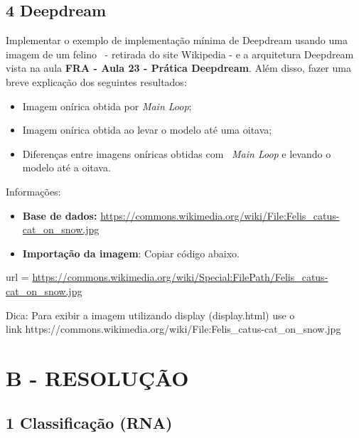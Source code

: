\subsection*{\textbf{4 Deepdream}}


Implementar o exemplo de implementação mínima de Deepdream usando uma imagem de um felino \ {}- retirada do site
Wikipedia - e a arquitetura Deepdream vista na aula \textbf{FRA - Aula 23 - Prática Deepdream}. Além disso, fazer uma
breve explicação dos seguintes resultados: 

\begin{itemize}
\item Imagem onírica obtida por \textit{Main Loop};
\item Imagem onírica obtida ao levar o modelo até uma oitava;
\item Diferenças entre imagens oníricas obtidas com \ \textit{Main Loop }e levando o modelo até a oitava.
\end{itemize}
Informações:

\begin{itemize}[resume*=listWWNumxiii]
\item \textbf{Base de dados: }\url{https://commons.wikimedia.org/wiki/File:Felis_catus-cat_on_snow.jpg}
\end{itemize}
\begin{itemize}
\item \textbf{Importação da imagem}: Copiar código abaixo.
\end{itemize}

\foreignlanguage{english}{\textcolor[HTML]{188038}{url =
{\textquotedbl}}}\url{https://commons.wikimedia.org/wiki/Special:FilePath/Felis_catus-cat_on_snow.jpg}\foreignlanguage{english}{\textcolor[HTML]{188038}{{\textquotedbl}}}


\textcolor[HTML]{188038}{Dica: Para exibir a imagem utilizando display (display.html) use o \\link
https://commons.wikimedia.org/wiki/File:Felis\_catus-cat\_on\_snow.jpg}


\section*{\textbf{B - RESOLUÇÃO}}

\subsection*{\textbf{1 Classificação (RNA)}}
